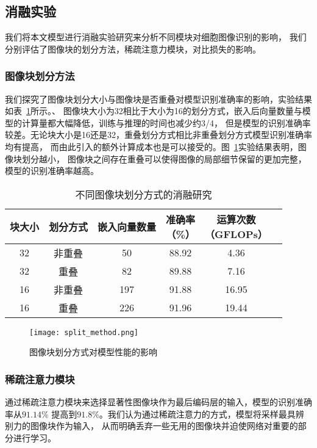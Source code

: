 \subsection{消融实验}
我们将本文模型进行消融实验研究来分析不同模块对细胞图像识别的影响，
我们分别评估了图像块的划分方法，稀疏注意力模块，对比损失的影响。

\subsubsection{图像块划分方法}
我们探究了图像块划分大小与图像块是否重叠对模型识别准确率的影响，实验结果如表~\ref{table:split_method}所示。、
图像块大小为32相比于大小为16的划分方式，嵌入后向量数量与模型的计算量都大幅降低，训练与推理的时间也减少约3/4，
但是模型的识别准确率较差。无论块大小是16还是32，重叠划分方式相比非重叠划分方式模型识别准确率均有提高，
而由此引入的额外计算成本也是可以接受的。图~\ref{fig:split_method}实验结果表明，图像块划分越小，
图像块之间存在重叠可以使得图像的局部细节保留的更加完整，模型的识别准确率越高。

\begin{table}
  \caption{不同图像块划分方式的消融研究}   
  \centering 
  \label{table:split_method}
  \begin{tabular}{cccccc}
    \toprule[2pt]
    块大小 & 划分方式 & 嵌入向量数量 & \makecell{准确率 \\（\%）} & \makecell{运算次数 \\（GFLOPs）}\\
    \midrule[1.5pt] 
        32 & 非重叠 & 50 & 88.92 & 4.36  \\ 
        32 & 重叠 & 82 & 89.88 & 7.16  \\ 
        16 & 非重叠 & 197 & 91.88 & 16.95  \\ 
        16 & 重叠 & 226 & 91.96 & 19.44  \\ 
    \bottomrule[2pt]      
  \end{tabular} 
\end{table}
\begin{figure} 
  \centering   
  \texttt{[image: split\_method.png]}   
  \caption{图像块划分方式对模型性能的影响}   
  \label{fig:split_method} 
\end{figure}  

\subsubsection{稀疏注意力模块}
通过稀疏注意力模块来选择显著性图像块作为最后编码层的输入，模型的识别准确率从$91.14\%$ 
提高到$91.8\%$。我们认为通过稀疏注意力的方式，模型将采样最具辨别力的图像块作为输入，
从而明确丢弃一些无用的图像块并迫使网络对重要的部分进行学习。

